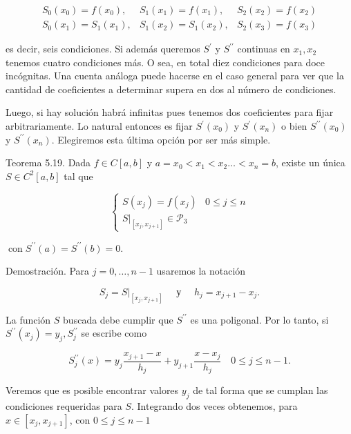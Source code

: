 \documentclass[10pt]{book}
\begin{document}
$$
\begin{array}{lll}
S_{0}\left(x_{0}\right)=f\left(x_{0}\right), & S_{1}\left(x_{1}\right)=f\left(x_{1}\right), & S_{2}\left(x_{2}\right)=f\left(x_{2}\right) \\
S_{0}\left(x_{1}\right)=S_{1}\left(x_{1}\right), & S_{1}\left(x_{2}\right)=S_{1}\left(x_{2}\right), & S_{2}\left(x_{3}\right)=f\left(x_{3}\right)
\end{array}
$$

es decir, seis condiciones. Si además queremos $S^{\prime}$ y $S^{\prime \prime}$ continuas en $x_{1}, x_{2}$ tenemos cuatro condiciones más. O sea, en total diez condiciones para doce incógnitas. Una cuenta análoga puede hacerse en el caso general para ver que la cantidad de coeficientes a determinar supera en dos al número de condiciones.

Luego, si hay solución habrá infinitas pues tenemos dos coeficientes para fijar arbitrariamente. Lo natural entonces es fijar $S^{\prime}\left(x_{0}\right)$ y $S^{\prime}\left(x_{n}\right)$ o bien $S^{\prime \prime}\left(x_{0}\right)$ y $S^{\prime \prime}\left(x_{n}\right)$. Elegiremos esta última opción por ser más simple.

Teorema 5.19. Dada $f \in C[a, b]$ y $a=x_{0}<x_{1}<x_{2} \ldots<x_{n}=b$, existe un única $S \in C^{2}[a, b]$ tal que

$$
\begin{cases}S\left(x_{j}\right)=f\left(x_{j}\right) & 0 \leq j \leq n \\ \left.S\right|_{\left[x_{j}, x_{j+1}\right]} \in \mathcal{P}_{3} & \end{cases}
$$

$\operatorname{con} S^{\prime \prime}(a)=S^{\prime \prime}(b)=0$.

Demostración. Para $j=0, \ldots, n-1$ usaremos la notación

$$
S_{j}=\left.S\right|_{\left[x_{j}, x_{j+1}\right]} \quad \text { у } \quad h_{j}=x_{j+1}-x_{j} .
$$

La función $S$ buscada debe cumplir que $S^{\prime \prime}$ es una poligonal. Por lo tanto, si $S^{\prime \prime}\left(x_{j}\right)=y_{j}, S_{j}^{\prime \prime}$ se escribe como

$$
S_{j}^{\prime \prime}(x)=y_{j} \frac{x_{j+1}-x}{h_{j}}+y_{j+1} \frac{x-x_{j}}{h_{j}} \quad 0 \leq j \leq n-1 .
$$

Veremos que es posible encontrar valores $y_{j}$ de tal forma que se cumplan las condiciones requeridas para $S$. Integrando dos veces obtenemos, para $x \in\left[x_{j}, x_{j+1}\right]$, con $0 \leq j \leq n-1$
\end{document}
